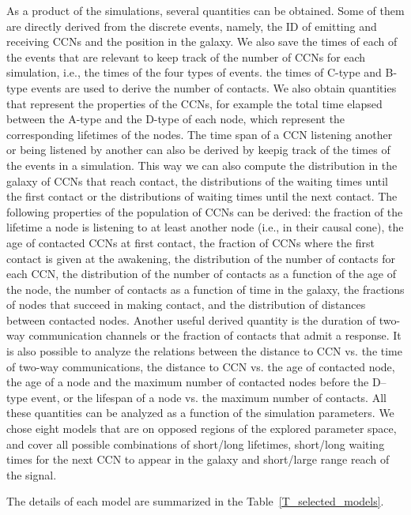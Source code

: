 \documentclass[crop]{CSLB}
\newcommand{\ceti}{CCN}
\newcommand{\cetis}{CCNs}
\newcommand{\ttn}[1]{}
\begin{document}
As a product of the simulations, several quantities can be obtained.
%
Some of them are directly derived from the discrete events, namely,
the ID of emitting and receiving \cetis{} and the position in the
galaxy.
%
We also save the times of each of the events that are relevant to keep
track of the number of \cetis{} for each simulation, i.e., the times
of the four types of events.
%
the times of C-type and B-type events are used to derive the number of
contacts.
%
We also obtain quantities that represent the
properties of the \cetis{}, for example the total time elapsed between the
A-type and the D-type of each node, which represent the corresponding
lifetimes of the nodes.
%
The time span of a \ceti{} listening another or being listened by another
can also be derived by keepig track of the times of the events in a simulation.
%
This way we can also compute the distribution in the galaxy of
\cetis{}
that reach contact, the distributions of the waiting times until the 
first contact or the distributions of
waiting times until the next contact.
%
The following properties of the population of \cetis{} can be derived:
%
the fraction of the lifetime a node is listening
to
at least another node (i.e., in their causal cone),
%
the age of
contacted \cetis{} at first contact,
%
the fraction of \cetis{} where the first contact is
given at the awakening,
%
the distribution of the number of contacts for
each \ceti{},
%
the distribution of the number of contacts as a function of
the age of the node,
%
the number of contacts as a function of time in the galaxy,
%
the fractions of nodes that succeed in making contact,
%
and the distribution of
distances between contacted nodes.
%
Another useful derived quantity is the duration of two-way
communication channels or the fraction of contacts that admit a
response.
% 
It is also possible to analyze the relations between the distance to
\ceti{} vs. the time of two-way communications, the distance to \ceti{} vs. the
age of contacted node, the age of a node and the maximum number of
contacted nodes before the D--type event, or the lifespan of a node vs. the
maximum number of contacts.
%
All these quantities can be analyzed as a function of the
simulation parameters.
%
We chose eight models that are on opposed regions of the
explored parameter space, and cover
all possible combinations of 
short/long lifetimes, short/long
waiting times for the next \ceti{} to appear in the galaxy and short/large
range reach of the signal.
%
\ttn{2}
%
The details of each model are summarized in the
Table~\ref{T_selected_models}.
\end{document}
